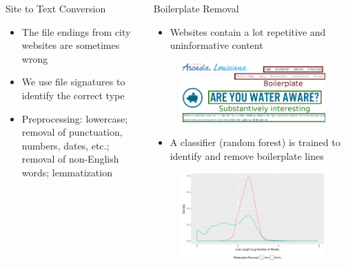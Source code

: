 \documentclass{beamer}
\begin{document}
\begin{frame}[fragile]
\begin{columns}[T]
\begin{column}{.4\textwidth}
\begin{block}{Site to Text Conversion}

\begin{itemize}
\item The file endings from city websites are sometimes wrong
\item We use file signatures to identify the correct type
\item Preprocessing: lowercase; removal of punctuation, numbers, dates, etc.; removal of non-English words; lemmatization
\end{itemize}
\end{block}

\end{column}
\begin{column}{.6\textwidth}
\begin{block}{Boilerplate Removal}
\begin{itemize}
\item Websites contain a lot repetitive and uninformative content
\end{itemize}
\begin{figure}
    \centering
    \includegraphics[width=.65\linewidth]{arcadia_water_TADA_rect.png}
\end{figure}
\begin{itemize}
\item A classifier (random forest) is trained to identify and remove boilerplate lines
\end{itemize}
\begin{minipage}{\textwidth}
  \begin{minipage}[b]{0.49\textwidth}
    \begin{figure}
        \centering
        \includegraphics[width=0.85\linewidth]{boilerplateBeforeAfterNwords.pdf}

\end{figure}
\end{minipage}
\end{minipage}
\end{block}
\end{column}
\end{columns}
\end{frame}
\end{document}
